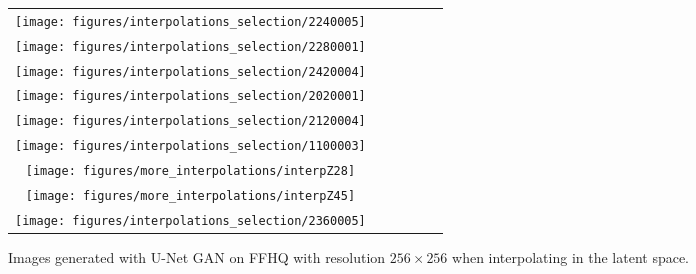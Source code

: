 \documentclass[10pt,twocolumn,letterpaper]{article}
\begin{document}
\begin{figure*}
\begin{centering}
\setlength{\tabcolsep}{0.1em}
\renewcommand{\arraystretch}{0}
\par\end{centering}
\begin{centering}
\vspace{-1.5em}
\hfill{}\begin{tabular}{c@{\hskip 0.05in}c@{\hskip 0.05in}c@{\hskip 0.05in}c@{\hskip 0.05in}c@{\hskip 0.05in}c}


\texttt{[image: figures/interpolations\_selection/2240005]}\tabularnewline
\texttt{[image: figures/interpolations\_selection/2280001]}\tabularnewline
\texttt{[image: figures/interpolations\_selection/2420004]}\tabularnewline
\texttt{[image: figures/interpolations\_selection/2020001]}\tabularnewline
\texttt{[image: figures/interpolations\_selection/2120004]}\tabularnewline

\texttt{[image: figures/interpolations\_selection/1100003]}\tabularnewline
\texttt{[image: figures/more\_interpolations/interpZ28]}\tabularnewline
\texttt{[image: figures/more\_interpolations/interpZ45]}\tabularnewline
\texttt{[image: figures/interpolations\_selection/2360005]}\tabularnewline







\end{tabular}\hfill{}
\par\end{centering}
\vspace{-0.5em}
\caption{\label{fig:more_ffhq_interpolations} Images generated with U-Net GAN on FFHQ with resolution $256 \times 256$ when interpolating in the latent space.} \vspace{0em}
\end{figure*}
 
\end{document}
